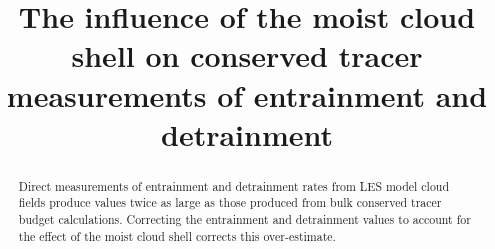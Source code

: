 \documentclass[draft,grl]{AGUTeX}
\begin{document}
%
%


\title{The influence of the moist cloud shell on conserved tracer measurements 
of entrainment and detrainment}
%

%
%






%
%


\begin{abstract}
Direct measurements of entrainment and detrainment rates from LES model 
cloud fields produce values twice as large as those produced from bulk 
conserved tracer budget calculations.  Correcting the entrainment and 
detrainment values to account for the effect of the moist cloud shell 
corrects this over-estimate.  
\end{abstract}

%
%

%
\end{document}
